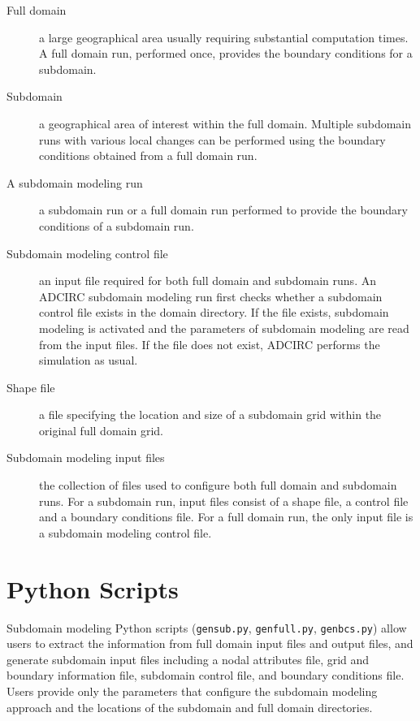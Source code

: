 \documentclass[11pt,titlepage]{article}
\begin{document}
\begin{description}

\item[Full domain] a large geographical area usually requiring
  substantial computation times. A full domain run, performed once,
  provides the boundary conditions for a subdomain.

\item[Subdomain] a geographical area of interest within the full
  domain. Multiple subdomain runs with various local changes can be
  performed using the boundary conditions obtained from a full domain
  run.

\item[A subdomain modeling run] a subdomain run or a full domain run
  performed to provide the boundary conditions of a subdomain run.

\item[Subdomain modeling control file] an input file required for both
  full domain and subdomain runs. An ADCIRC subdomain modeling run
  first checks whether a subdomain control file exists in the domain
  directory. If the file exists, subdomain modeling is activated and
  the parameters of subdomain modeling are read from the input
  files. If the file does not exist, ADCIRC performs the simulation as
  usual.

\item[Shape file] a file specifying the location and size of a
  subdomain grid within the original full domain grid.

\item[Subdomain modeling input files] the collection of files used to
  configure both full domain and subdomain runs. For a subdomain run,
  input files consist of a shape file, a control file and a boundary
  conditions file. For a full domain run, the only input file is a
  subdomain modeling control file.

\end{description}

\section{Python Scripts}

Subdomain modeling Python scripts (\verb+gensub.py+,
\verb+genfull.py+, \verb+genbcs.py+) allow users to extract the
information from full domain input files and output files, and
generate subdomain input files including a nodal attributes file, grid
and boundary information file, subdomain control file, and boundary
conditions file. Users provide only the parameters that configure the subdomain
modeling approach and the locations of the subdomain and full domain
directories. 
\end{document}
